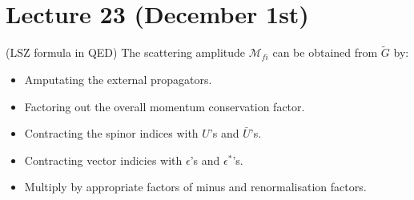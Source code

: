 \section{Lecture 23 (December 1st)}
\begin{thm}
(LSZ formula in QED) The scattering amplitude $\mathcal{M}_{fi}$ can be obtained from $\tilde{G}$ by:
\begin{itemize}
\item[(i)] Amputating the external propagators.
\item[(ii)] Factoring out the overall momentum conservation factor.
\item[(iii)] Contracting the spinor indices with $U$'s and $\bar{U}$'s.
\item[(iv)] Contracting vector indicies with $\epsilon $'s and $\epsilon ^{*}$'s.
\item[(v)] Multiply by appropriate factors of minus and renormalisation factors.
\end{itemize}
\end{thm}
\vspace{2ex}
